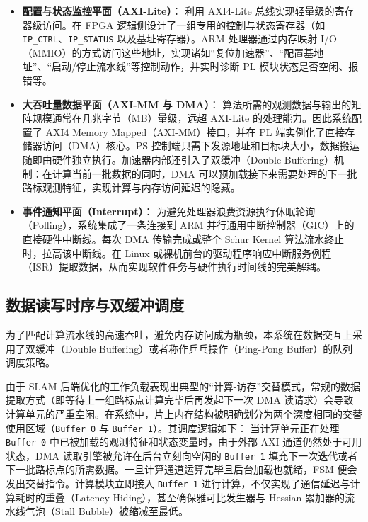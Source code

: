 \begin{itemize}
    \item \textbf{配置与状态监控平面（AXI-Lite）}：
    利用 AXI4-Lite 总线实现轻量级的寄存器级访问。在 FPGA 逻辑侧设计了一组专用的控制与状态寄存器（如 \texttt{IP\_CTRL}、\texttt{IP\_STATUS} 以及基址寄存器）。ARM 处理器通过内存映射 I/O（MMIO）的方式访问这些地址，实现诸如“复位加速器”、“配置基地址”、“启动/停止流水线”等控制动作，并实时诊断 PL 模块状态是否空闲、报错等。

    \item \textbf{大吞吐量数据平面（AXI-MM 与 DMA）}：
    算法所需的观测数据与输出的矩阵规模通常在几兆字节（MB）量级，远超 AXI-Lite 的处理能力。因此系统配置了 AXI4 Memory Mapped（AXI-MM）接口，并在 PL 端实例化了直接存储器访问（DMA）核心。PS 控制端只需下发源地址和目标块大小，数据搬运随即由硬件独立执行。加速器内部还引入了双缓冲（Double Buffering）机制：在计算当前一批数据的同时，DMA 可以预加载接下来需要处理的下一批路标观测特征，实现计算与内存访问延迟的隐藏。

    \item \textbf{事件通知平面（Interrupt）}：
    为避免处理器浪费资源执行休眠轮询（Polling），系统集成了一条连接到 ARM 并行通用中断控制器（GIC）上的直接硬件中断线。每次 DMA 传输完成或整个 Schur Kernel 算法流水终止时，拉高该中断线。在 Linux 或裸机前台的驱动程序响应中断服务例程（ISR）提取数据，从而实现软件任务与硬件执行时间线的完美解耦。
\end{itemize}

\subsection{数据读写时序与双缓冲调度}

为了匹配计算流水线的高速吞吐，避免内存访问成为瓶颈，本系统在数据交互上采用了双缓冲（Double Buffering）或者称作乒乓操作（Ping-Pong Buffer）的队列调度策略。

由于 SLAM 后端优化的工作负载表现出典型的“计算-访存”交替模式，常规的数据提取方式（即等待上一组路标点计算完毕后再发起下一次 DMA 读请求）会导致计算单元的严重空闲。在系统中，片上内存结构被明确划分为两个深度相同的交替使用区域（\texttt{Buffer 0} 与 \texttt{Buffer 1}）。其调度逻辑如下：
当计算单元正在处理 \texttt{Buffer 0} 中已被加载的观测特征和状态变量时，由于外部 AXI 通道仍然处于可用状态，DMA 读取引擎被允许在后台立刻向空闲的 \texttt{Buffer 1} 填充下一次迭代或者下一批路标点的所需数据。一旦计算通道运算完毕且后台加载也就绪，FSM 便会发出交替指令。计算模块立即接入 \texttt{Buffer 1} 进行计算，不仅实现了通信延迟与计算耗时的重叠（Latency Hiding），甚至确保雅可比发生器与 Hessian 累加器的流水线气泡（Stall Bubble）被缩减至最低。

